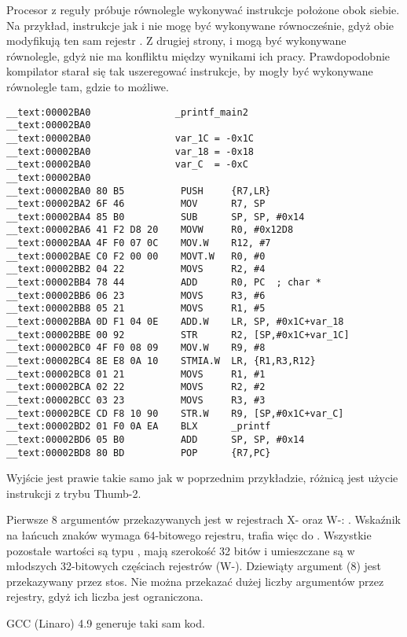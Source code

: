 Procesor z reguły próbuje równolegle wykonywać instrukcje położone obok siebie. Na przykład, instrukcje jak  i
 nie mogę być wykonywane równocześnie, gdyż obie modyfikują ten sam rejestr .
Z drugiej strony,  i 
mogą być wykonywane równolegle, gdyż nie ma konfliktu między wynikami ich pracy.
Prawdopodobnie kompilator starał się tak uszeregować instrukcje, by mogły być wykonywane równolegle tam, gdzie to możliwe.
 
\myparagraph{\OptimizingXcodeIV: \ThumbTwoMode}

\begin{lstlisting}[style=customasmARM]
__text:00002BA0               _printf_main2
__text:00002BA0
__text:00002BA0               var_1C = -0x1C
__text:00002BA0               var_18 = -0x18
__text:00002BA0               var_C  = -0xC
__text:00002BA0
__text:00002BA0 80 B5          PUSH     {R7,LR}
__text:00002BA2 6F 46          MOV      R7, SP
__text:00002BA4 85 B0          SUB      SP, SP, #0x14
__text:00002BA6 41 F2 D8 20    MOVW     R0, #0x12D8
__text:00002BAA 4F F0 07 0C    MOV.W    R12, #7
__text:00002BAE C0 F2 00 00    MOVT.W   R0, #0
__text:00002BB2 04 22          MOVS     R2, #4
__text:00002BB4 78 44          ADD      R0, PC  ; char *
__text:00002BB6 06 23          MOVS     R3, #6
__text:00002BB8 05 21          MOVS     R1, #5
__text:00002BBA 0D F1 04 0E    ADD.W    LR, SP, #0x1C+var_18
__text:00002BBE 00 92          STR      R2, [SP,#0x1C+var_1C]
__text:00002BC0 4F F0 08 09    MOV.W    R9, #8
__text:00002BC4 8E E8 0A 10    STMIA.W  LR, {R1,R3,R12}
__text:00002BC8 01 21          MOVS     R1, #1
__text:00002BCA 02 22          MOVS     R2, #2
__text:00002BCC 03 23          MOVS     R3, #3
__text:00002BCE CD F8 10 90    STR.W    R9, [SP,#0x1C+var_C]
__text:00002BD2 01 F0 0A EA    BLX      _printf
__text:00002BD6 05 B0          ADD      SP, SP, #0x14
__text:00002BD8 80 BD          POP      {R7,PC}
\end{lstlisting}

Wyjście jest prawie takie samo jak w poprzednim przykładzie, różnicą jest użycie instrukcji z trybu Thumb-2.





Pierwsze 8 argumentów przekazywanych jest w rejestrach X- oraz W-: \ARMPCS.
Wskaźnik na łańcuch znaków wymaga 64-bitowego rejestru, trafia więc do .
Wszystkie pozostałe wartości są typu \Tint, mają szerokość 32 bitów i umieszczane są w młodszych 32-bitowych częściach rejestrów (W-).
Dziewiąty argument (8) jest przekazywany przez stos.
Nie można przekazać dużej liczby argumentów przez rejestry, gdyż ich liczba jest ograniczona.

\Optimizing GCC (Linaro) 4.9 generuje taki sam kod.

